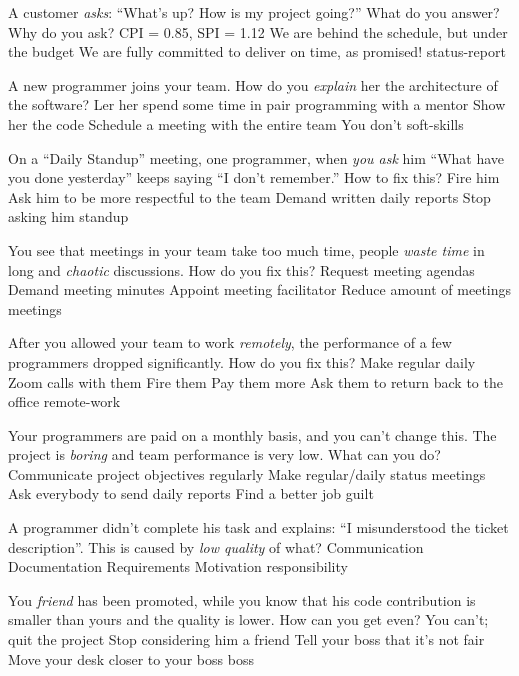 \documentclass{article}
\begin{document}

\pmbaQuestion
  {A customer \emph{asks}: ``What's up? How is my project going?'' What do you answer?}
  {Why do you ask?}
  {CPI = 0.85, SPI = 1.12}
  {We are behind the schedule, but under the budget}
  {We are fully committed to deliver on time, as promised!}
  {status-report}

\pmbaQuestion
  {A new programmer joins your team. How do you \emph{explain} her the architecture of the software?}
  {Ler her spend some time in pair programming with a mentor}
  {Show her the code}
  {Schedule a meeting with the entire team}
  {You don't}
  {soft-skills}

\pmbaQuestion
  {On a ``Daily Standup'' meeting, one programmer, when \emph{you ask} him ``What have you done yesterday'' keeps saying ``I don't remember.'' How to fix this?}
  {Fire him}
  {Ask him to be more respectful to the team}
  {Demand written daily reports}
  {Stop asking him}
  {standup}

\pmbaQuestion
  {You see that meetings in your team take too much time, people \emph{waste time} in long and \emph{chaotic} discussions. How do you fix this?}
  {Request meeting agendas}
  {Demand meeting minutes}
  {Appoint meeting facilitator}
  {Reduce amount of meetings}
  {meetings}

\pmbaQuestion
  {After you allowed your team to work \emph{remotely}, the performance of a few programmers dropped significantly. How do you fix this?}
  {Make regular daily Zoom calls with them}
  {Fire them}
  {Pay them more}
  {Ask them to return back to the office}
  {remote-work}

\pmbaQuestion
  {Your programmers are paid on a monthly basis, and you can't change this. The project is \emph{boring} and team performance is very low. What can you do?}
  {Communicate project objectives regularly}
  {Make regular/daily status meetings}
  {Ask everybody to send daily reports}
  {Find a better job}
  {guilt}

\pmbaQuestion
  {A programmer didn't complete his task and explains: ``I misunderstood the ticket description''. This is caused by \emph{low quality} of what?}
  {Communication}
  {Documentation}
  {Requirements}
  {Motivation}
  {responsibility}

\pmbaQuestion
  {You \emph{friend} has been promoted, while you know that his code contribution is smaller than yours and the quality is lower. How can you get even?}
  {You can't; quit the project}
  {Stop considering him a friend}
  {Tell your boss that it's not fair}
  {Move your desk closer to your boss}
  {boss}
\end{document}
